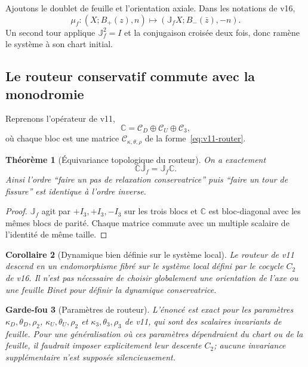 \documentclass[11pt,a4paper]{article}
\newtheorem{theorem}{Théorème}[section]
\newtheorem{corollary}[theorem]{Corollaire}
\newtheorem{guardrail}[theorem]{Garde-fou}
\begin{document}
Ajoutons le doublet de feuille et l'orientation axiale. Dans les notations de v16,
\begin{equation}\label{eq:v17-full-monodromy}
 \boxed{
 \mu_f:
 (X;B_+(z),n)
 \longmapsto
 (\mathbb J_fX;B_-(\bar z),-n).}
\end{equation}
Un second tour applique $\mathbb J_f^2=I$ et la conjugaison croisée deux fois, donc ramène le système à son chart initial.

\subsection{Le routeur conservatif commute avec la monodromie}

Reprenons l'opérateur de v11,
\[
 \mathbb C
 =
 \mathcal C_D\oplus\mathcal C_U\oplus\mathcal C_3,
\]
où chaque bloc est une matrice $\mathcal C_{\kappa,\theta,\rho}$ de la forme~\eqref{eq:v11-router}.

\begin{theorem}[Équivariance topologique du routeur]\label{thm:v17-router-commutes}
On a exactement
\begin{equation}\label{eq:v17-router-commutes}
 \boxed{
 \mathbb C\mathbb J_f
 =
 \mathbb J_f\mathbb C.}
\end{equation}
Ainsi l'ordre ``faire un pas de relaxation conservatrice'' puis ``faire un tour de fissure'' est identique à l'ordre inverse.
\end{theorem}

\begin{proof}
$\mathbb J_f$ agit par $+I_3,+I_3,-I_3$ sur les trois blocs et $\mathbb C$ est bloc-diagonal avec les mêmes blocs de parité. Chaque matrice commute avec un multiple scalaire de l'identité de même taille.
\end{proof}

\begin{corollary}[Dynamique bien définie sur le système local]\label{cor:v17-bundle-endomorphism}
Le routeur de v11 descend en un endomorphisme fibré sur le système local défini par le cocycle $C_2$ de v16. Il n'est pas nécessaire de choisir globalement une orientation de l'axe ou une feuille Binet pour définir la dynamique conservatrice.
\end{corollary}

\begin{guardrail}[Paramètres de routeur]
L'énoncé est exact pour les paramètres $\kappa_D,\theta_D,\rho_2$, $\kappa_U,\theta_U,\rho_2$ et $\kappa_3,\theta_3,\rho_3$ de v11, qui sont des scalaires invariants de feuille. Pour une généralisation où ces paramètres dépendraient du chart ou de la feuille, il faudrait imposer explicitement leur descente $C_2$; aucune invariance supplémentaire n'est supposée silencieusement.
\end{guardrail}
\end{document}
